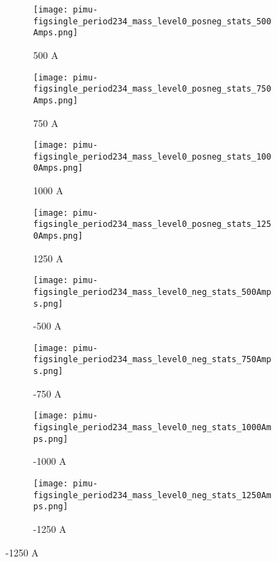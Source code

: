  \begin{figure}[h]	
 \centering   
            \begin{subfigure}[b]{0.24\textwidth}
            \centering
            \texttt{[image: pimu-figsingle\_period234\_mass\_level0\_posneg\_stats\_500Amps.png]}
            \caption{500 A}
            \label{fig_mpimu500}
            \end{subfigure}
             \hfill   
            \begin{subfigure}[b]{0.24\textwidth}
            \centering
            \texttt{[image: pimu-figsingle\_period234\_mass\_level0\_posneg\_stats\_750Amps.png]}
            \caption{750 A}
            \label{fig_mpimu750}
            \end{subfigure}
             \hfill   
            \begin{subfigure}[b]{0.24\textwidth}
            \centering
            \texttt{[image: pimu-figsingle\_period234\_mass\_level0\_posneg\_stats\_1000Amps.png]}
            \caption{1000 A}
            \label{fig_mpimu1000}
            \end{subfigure}
             \hfill                             
             \begin{subfigure}[b]{0.24\textwidth}
            \centering
            \texttt{[image: pimu-figsingle\_period234\_mass\_level0\_posneg\_stats\_1250Amps.png]}
            \caption{1250 A}
            \label{fig_mpimu1250}
            \end{subfigure}
            
             \begin{subfigure}[b]{0.24\textwidth}
            \centering
            \texttt{[image: pimu-figsingle\_period234\_mass\_level0\_neg\_stats\_500Amps.png]}
            \caption{-500 A}
            \label{fig_mpimu500}
            \end{subfigure}
             \hfill   
            \begin{subfigure}[b]{0.24\textwidth}
            \centering
            \texttt{[image: pimu-figsingle\_period234\_mass\_level0\_neg\_stats\_750Amps.png]}
            \caption{-750 A}
            \label{fig_mpimu750}
            \end{subfigure}
             \hfill   
            \begin{subfigure}[b]{0.24\textwidth}
            \centering
            \texttt{[image: pimu-figsingle\_period234\_mass\_level0\_neg\_stats\_1000Amps.png]}
            \caption{-1000 A}
            \label{fig_mpimu1000}
            \end{subfigure}
             \hfill                             
             \begin{subfigure}[b]{0.24\textwidth}
            \centering
            \texttt{[image: pimu-figsingle\_period234\_mass\_level0\_neg\_stats\_1250Amps.png]}
            \caption{-1250 A}
            \label{fig_mpimu-1250}
            \end{subfigure}
            

\end{figure}
